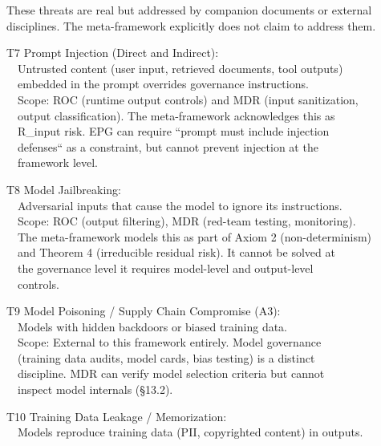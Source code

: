 These threats are real but addressed by companion documents or external disciplines. The meta-framework explicitly does not claim to address them.

\begin{claddisp}
T7 \textemdash{} Prompt Injection (Direct and Indirect):\\
~~Untrusted content (user input, retrieved documents, tool outputs)\\
~~embedded in the prompt overrides governance instructions.\\
~~Scope: ROC (runtime output controls) and MDR (input sanitization,\\
~~output classification). The meta-framework acknowledges this as\\
~~R\_input risk. EPG can require ``prompt must include injection\\
~~defenses`` as a constraint, but cannot prevent injection at the\\
~~framework level.
\par\smallskip
T8 \textemdash{} Model Jailbreaking:\\
~~Adversarial inputs that cause the model to ignore its instructions.\\
~~Scope: ROC (output filtering), MDR (red-team testing, monitoring).\\
~~The meta-framework models this as part of Axiom 2 (non-determinism)\\
~~and Theorem 4 (irreducible residual risk). It cannot be solved at\\
~~the governance level \textemdash{} it requires model-level and output-level\\
~~controls.
\par\smallskip
T9 \textemdash{} Model Poisoning / Supply Chain Compromise (A3):\\
~~Models with hidden backdoors or biased training data.\\
~~Scope: External to this framework entirely. Model governance\\
~~(training data audits, model cards, bias testing) is a distinct\\
~~discipline. MDR can verify model selection criteria but cannot\\
~~inspect model internals (\S{}13.2).
\par\smallskip
T10 \textemdash{} Training Data Leakage / Memorization:\\
~~Models reproduce training data (PII, copyrighted content) in outputs.\\

\end{claddisp}
